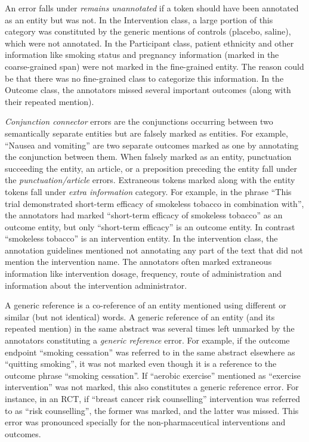 \documentclass[10.7pt,]{article}
\begin{document}
An error falls under \textit{remains unannotated} if a token should have been annotated as an entity but was not.
In the Intervention class, a large portion of this category was constituted by the generic mentions of controls (placebo, saline), which were not annotated.
In the Participant class, patient ethnicity and other information like smoking status and pregnancy information (marked in the coarse-grained span) were not marked in the fine-grained entity.
The reason could be that there was no fine-grained class to categorize this information. 
In the Outcome class, the annotators missed several important outcomes (along with their repeated mention).

\textit{Conjunction connector} errors are the conjunctions occurring between two semantically separate entities but are falsely marked as entities.
For example, ``Nausea and vomiting'' are two separate outcomes marked as one by annotating the conjunction between them.
When falsely marked as an entity, punctuation succeeding the entity, an article, or a preposition preceding the entity fall under the \textit{punctuation/article} errors.
Extraneous tokens marked along with the entity tokens fall under \textit{extra information} category.
For example, in the phrase ``This trial demonstrated short-term efficacy of smokeless tobacco in combination with'', the annotators had marked ``short-term efficacy of smokeless tobacco'' as an outcome entity, but only ``short-term efficacy'' is an outcome entity.
In contrast ``smokeless tobacco'' is an intervention entity. 
In the intervention class, the annotation guidelines mentioned not annotating any part of the text that did not mention the intervention name.
The annotators often marked extraneous information like intervention dosage, frequency, route of administration and information about the intervention administrator.


A generic reference is a co-reference of an entity mentioned using different or similar (but not identical) words. 
A generic reference of an entity (and its repeated mention) in the same abstract was several times left unmarked by the annotators constituting a \textit{generic reference} error.
For example, if the outcome endpoint ``smoking cessation'' was referred to in the same abstract elsewhere as ``quitting smoking'', it was not marked even though it is a reference to the outcome phrase ``smoking cessation''.
If ``aerobic exercise'' mentioned as ``exercise intervention'' was not marked, this also constitutes a generic reference error.
For instance, in an RCT, if ``breast cancer risk counselling'' intervention was referred to as ``risk counselling'', the former was marked, and the latter was missed.
This error was pronounced specially for the non-pharmaceutical interventions and outcomes.
\end{document}
